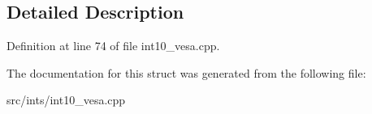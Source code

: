 \subsection{Detailed Description}


Definition at line 74 of file int10\-\_\-vesa.\-cpp.



The documentation for this struct was generated from the following file\-:\begin{DoxyCompactItemize}
\item 
src/ints/int10\-\_\-vesa.\-cpp\end{DoxyCompactItemize}
